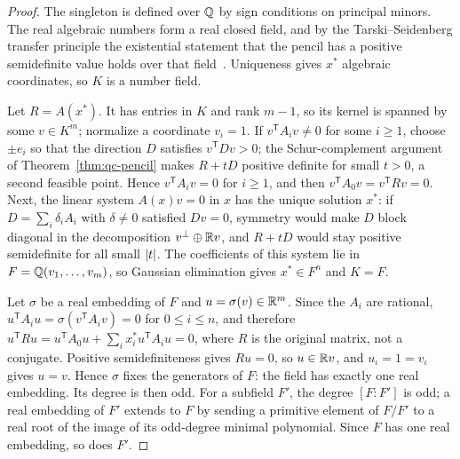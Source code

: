 \begin{proof}
The singleton is defined over $\mathbb Q$ by sign conditions on principal minors.
The real algebraic numbers form a real closed field, and by the
Tarski--Seidenberg transfer principle the existential statement that the
pencil has a positive semidefinite value holds over that
field~\cite{BasuPollackRoy2006}. Uniqueness gives $x^*$ algebraic coordinates,
so $K$ is a number field.

Let $R=A(x^*)$. It has entries in $K$ and rank $m-1$, so its kernel is spanned
by some $v\in K^m$; normalize a coordinate $v_\iota=1$. If
$v^{\mathsf T}A_iv\ne0$ for some $i\ge1$, choose $\pm e_i$ so that the
direction $D$ satisfies $v^{\mathsf T}Dv>0$; the Schur-complement argument of
Theorem~\ref{thm:qc-pencil} makes $R+tD$ positive definite for small $t>0$,
a second feasible point. Hence $v^{\mathsf T}A_iv=0$ for $i\ge1$, and then
$v^{\mathsf T}A_0v=v^{\mathsf T}Rv=0$. Next, the linear system $A(x)v=0$ in
$x$ has the unique solution $x^*$: if $D=\sum_i\delta_iA_i$ with $\delta\ne0$
satisfied $Dv=0$, symmetry would make $D$ block diagonal in the decomposition
$v^\perp\oplus\mathbb R v$, and $R+tD$ would stay positive semidefinite for all
small $\left\lvert t\right\rvert$. The coefficients of this system lie in $F=\mathbb Q(v_1,\ldots,v_m)$,
so Gaussian elimination gives $x^*\in F^n$ and $K=F$.

Let $\sigma$ be a real embedding of $F$ and $u=\sigma(v)\in\mathbb R^m$. Since the
$A_i$ are rational, $u^{\mathsf T}A_iu=\sigma(v^{\mathsf T}A_iv)=0$ for
$0\le i\le n$, and therefore $u^{\mathsf T}Ru=u^{\mathsf T}A_0u+
\sum_ix_i^*u^{\mathsf T}A_iu=0$, where $R$ is the original matrix, not a
conjugate. Positive semidefiniteness gives $Ru=0$, so $u\in\mathbb R v$, and
$u_\iota=1=v_\iota$ gives $u=v$. Hence $\sigma$ fixes the generators of $F$:
the field has exactly one real embedding. Its degree is then odd. For a
subfield $F'$, the degree $[F:F']$ is odd; a real embedding of $F'$ extends to
$F$ by sending a primitive element of $F/F'$ to a real root of the image of
its odd-degree minimal polynomial. Since $F$ has one real embedding, so does
$F'$.


\end{proof}
